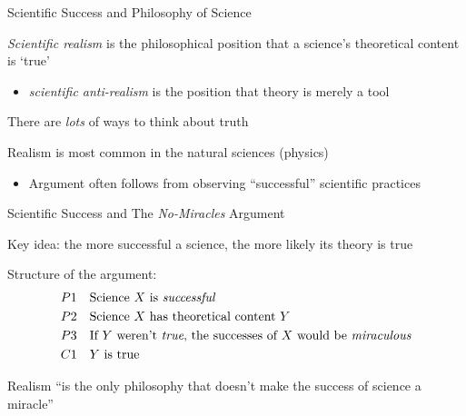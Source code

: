 \documentclass[aspectratio=169,xcolor=dvipsnames]{beamer}
\begin{document}

\begin{frame}{Scientific Success and Philosophy of Science}

\textit{Scientific realism} is the philosophical position that a science's theoretical content is `true'
\begin{itemize}
    \item \textit{scientific anti-realism} is the position that theory is merely a tool
\end{itemize}

\vspace{5mm}
There are \textit{lots} of ways to think about truth

\vspace{5mm}
Realism is most common in the natural sciences (physics)
\begin{itemize}
    \item Argument often follows from observing ``successful'' scientific practices
\end{itemize}

\end{frame}


\begin{frame}{Scientific Success and The \textit{No-Miracles} Argument}

{\color{red}Key idea: the more successful a science, the more likely its theory is true}

\vspace{5mm}
Structure of the argument:
\begin{align*}
    & P1 \quad \text{Science $X$ is \textit{successful}} \\
    & P2 \quad \text{Science $X$ has theoretical content $Y$} \\
    & P3 \quad \text{If $Y$ weren't \textit{true}, the successes of $X$ would be \textit{miraculous}} \\
    & C1 \quad \text{$Y$ is true}
\end{align*}

Realism ``is the only philosophy that doesn't make the success of science a miracle'' \autocite[73]{putnam1975}

\end{frame}

\end{document}
